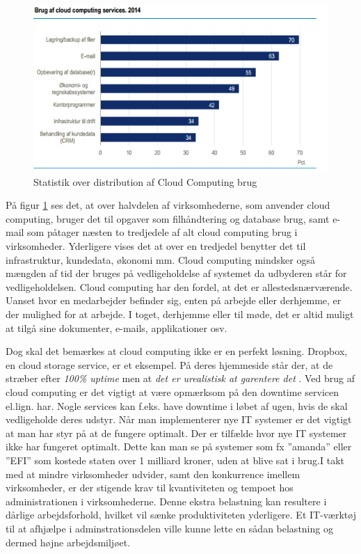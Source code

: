 \begin{figure}[p]
    \centering
    \includegraphics[width=1\textwidth]{figures/brugafccservices.png}
    \caption{Statistik over distribution af Cloud Computing brug \citep{itvirk}}
    \label{fig:distcc}
\end{figure}
\newpage
På figur \ref{fig:distcc} ses det, at over halvdelen af virksomhederne, som anvender cloud computing, bruger det til opgaver som filhåndtering og database brug, samt e-mail som påtager næsten to tredjedele af alt cloud computing brug i virksomheder. Yderligere vises det at over en tredjedel benytter det til infrastruktur, kundedata, økonomi mm. Cloud computing mindsker også mængden af tid der bruges på vedligeholdelse af systemet da udbyderen står for vedligeholdelsen. Cloud computing har den fordel, at det er allestedsnærværende. Uanset hvor en medarbejder befinder sig, enten på arbejde eller derhjemme, er der mulighed for at arbejde. I toget, derhjemme eller til møde, det er altid muligt at tilgå sine dokumenter, e-mails, applikationer osv.

Dog skal det bemærkes at cloud computing ikke er en perfekt løsning. Dropbox, en cloud storage service, er et eksempel. På deres hjemmeside står der, at de stræber efter \textit{100\% uptime} men at \textit{det er urealistisk at garentere det} \citep{drpbx_downtime}. Ved brug af cloud computing er det vigtigt at være opmærksom på den downtime servicen el.lign. har. Nogle services kan f.eks. have downtime i løbet af ugen, hvis de skal vedligeholde deres udstyr. Når man implementerer nye IT systemer er det vigtigt at man har styr på at de fungere optimalt. Der er tilfælde hvor nye IT systemer ikke har fungeret optimalt. Dette kan man se på systemer som fx ”amanda” eller ”EFI” som kostede staten over 1 milliard kroner, uden at blive sat i brug\citep{DrItsys}.I takt med at mindre virksomheder udvider, samt den konkurrence imellem virksomheder, er der stigende krav til kvantiviteten og tempoet hos administrationen i virksomhederne. Denne ekstra belastning kan resultere i dårlige arbejdsforhold, hvilket vil sænke produktiviteten yderligere. Et IT-værktøj til at afhjælpe i adminstrationsdelen ville kunne lette en sådan belastning og dermed højne arbejdsmiljøet\citep{It_armil}. 

